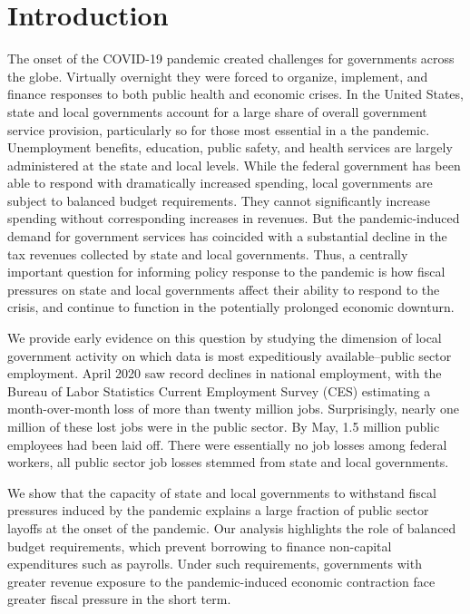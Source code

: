 

\section{Introduction}

The onset of the COVID-19 pandemic created challenges for governments across the globe. Virtually overnight they were forced to organize, implement, and finance responses to both public health and economic crises. In the United States, state and local governments account for a large share of overall government service provision, particularly so for those most essential in a the pandemic. Unemployment benefits, education, public safety, and health services are largely administered at the state and local levels. While the federal government has been able to respond with dramatically increased spending, local governments are subject to balanced budget requirements. They cannot significantly increase spending without corresponding increases in revenues. But the pandemic-induced demand for government services has coincided with a substantial decline in the tax revenues collected by state and local governments. Thus, a centrally important question for informing policy response to the pandemic is how fiscal pressures on state and local governments affect their ability to respond to the crisis, and continue to function in the potentially prolonged economic downturn. 

We provide early evidence on this question by studying the dimension of local government activity on which data is most expeditiously available--public sector employment. April 2020 saw record declines in national employment, with the Bureau of Labor Statistics Current Employment Survey (CES) estimating a month-over-month loss of more than twenty million jobs. Surprisingly, nearly one million of these lost jobs were in the public sector. By May, 1.5 million public employees had been laid off. There were essentially no job losses among federal workers, all public sector job losses stemmed from state and local governments.
  
We show that the capacity of state and local governments to withstand fiscal pressures induced by the pandemic explains a large fraction of public sector layoffs at the onset of the pandemic. Our analysis highlights the role of balanced budget requirements, which prevent borrowing to finance non-capital expenditures such as payrolls. Under such requirements, governments with greater revenue exposure to the pandemic-induced economic contraction face greater fiscal pressure in the short term.
 
